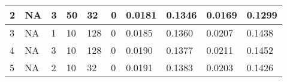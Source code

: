 \begin{table}
{\begin{tabular}{|llllllllll|}
2             & NA                                                              & 3                                                               & 50             & 32                                                             & 0                & 0.0181                                                                    & 0.1346                                                                   & 0.0169                                                               & 0.1299                                                              \\ \hline
3             & NA                                                              & 1                                                               & 10             & 128                                                            & 0                & 0.0185                                                                    & 0.1360                                                                   & 0.0207                                                               & 0.1438                                                              \\ \hline
4             & NA                                                              & 3                                                               & 10             & 128                                                            & 0                & 0.0190                                                                    & 0.1377                                                                   & 0.0211                                                               & 0.1452                                                              \\ \hline
5             & NA                                                              & 2                                                               & 10             & 32                                                             & 0                & 0.0191                                                                    & 0.1383                                                                   & 0.0203                                                               & 0.1426                                                              \\ \hline
\end{tabular}}
\end{table}
